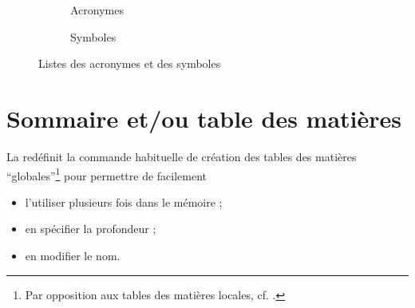 \begin{landscape}
  \begin{figure}[p]
    \centering
    \begin{subfigure}[b]{.45\linewidth}
      \centering
      \caption{Acronymes}
      \label{fig-printabbreviations}
    \end{subfigure}%
    \begin{subfigure}[b]{.45\linewidth}
      \centering
      \caption{Symboles}
      \label{fig-printsymbols}
    \end{subfigure}%
    \caption{Listes des acronymes et des symboles}
    \label{fig-printabbreviations-printsymbols}
  \end{figure}
\end{landscape}


\section{Sommaire et/ou table des matières}\label{sec-table-des-matieres}

La \yatCl{} redéfinit la commande  habituelle de
création des tables des matières \enquote{globales}\footnote{Par opposition aux
  tables des matières locales,
  cf. .} pour permettre de facilement
\begin{itemize}
\item l'utiliser plusieurs fois dans le mémoire ;
\item en spécifier la profondeur ;
\item en modifier le nom.
\end{itemize}

